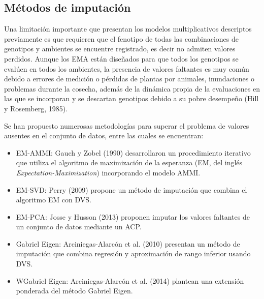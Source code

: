 \subsection{Métodos de imputación}


Una limitación importante que presentan los modelos multiplicativos descriptos previamente es que requieren que el fenotipo de todas las combinaciones de genotipos y ambientes se encuentre registrado, es decir no admiten valores perdidos. Aunque los EMA están diseñados para que todos los genotipos se evalúen en todos los ambientes, la presencia de valores faltantes es muy común debido a errores de medición o pérdidas de plantas por animales, inundaciones o problemas durante la cosecha, además de la dinámica propia de la evaluaciones en las que se incorporan y se descartan genotipos debido a su pobre desempeño (Hill y Rosemberg, 1985).

Se han propuesto numerosas metodologías para superar el problema de valores ausentes en el conjunto de datos, entre las cuales se encuentran:

\begin{itemize}
\item EM-AMMI: Gauch y Zobel (1990) desarrollaron un procedimiento iterativo que utiliza el algoritmo de maximización de la esperanza (EM, del inglés \emph{Expectation-Maximization}) incorporando el modelo AMMI. 
\end{itemize}
\begin{itemize}
\item EM-SVD: Perry (2009) propone un método de imputación que combina el algoritmo EM con DVS. 
\end{itemize}
\begin{itemize}
\item EM-PCA: Josse y Husson (2013) proponen imputar los valores faltantes de un conjunto de datos mediante un ACP.
\end{itemize}
\begin{itemize}
\item Gabriel Eigen: Arciniegas-Alarcón et al. (2010) presentan un método de imputación que combina regresión y aproximación de rango inferior usando DVS. 
\end{itemize}
\begin{itemize}
\item WGabriel Eigen: Arciniegas-Alarcón et al. (2014) plantean una extensión ponderada del método Gabriel Eigen.
\end{itemize}




